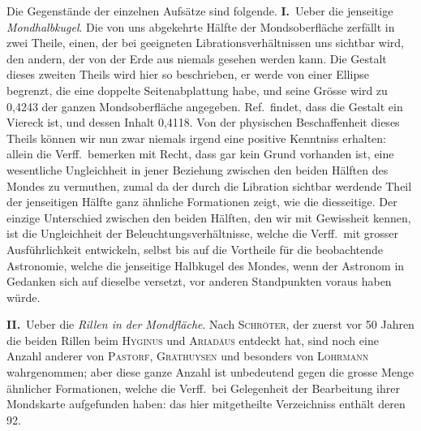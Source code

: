 \documentclass[12pt,a4paper]{article}
\begin{document}
Die Gegenst\"ande der einzelnen Aufs\"atze sind folgende. \textbf{I.}\ Ueber die jenseitige \textit{Mondhalbkugel}. Die von uns abgekehrte H\"alfte der Mondsoberfl\"ache zerf\"allt in zwei Theile, einen, der bei geeigneten Librationsverh\"altnissen uns sichtbar wird, den andern, der von der Erde aus niemals gesehen werden kann. Die Gestalt dieses zweiten Theils wird hier so beschrieben, er werde von einer Ellipse begrenzt, die eine doppelte Seitenabplattung habe, und seine Gr\"osse wird zu 0,4243 der ganzen Mondsoberfl\"ache angegeben. Ref.\ findet, dass die Gestalt ein Viereck ist, und dessen Inhalt 0,4118. Von der physischen Beschaffenheit dieses Theils k\"onnen wir nun zwar niemals irgend eine positive Kenntniss erhalten: allein die Verff.\ bemerken mit Recht, dass gar kein Grund vorhanden ist, eine wesentliche Ungleichheit in jener Beziehung zwischen den beiden H\"alften des Mondes zu vermuthen, zumal da der durch die Libration sichtbar werdende Theil der jenseitigen H\"alfte ganz \"ahnliche Formationen zeigt, wie die diesseitige. Der einzige Unterschied zwischen den beiden H\"alften, den wir mit Gewissheit kennen, ist die Ungleichheit der Beleuchtungsverh\"altnisse, welche die Verff.\ mit grosser Ausf\"uhrlichkeit entwickeln, selbst bis auf die Vortheile f\"ur die beobachtende Astronomie, welche die jenseitige Halbkugel des Mondes, wenn der Astronom in Gedanken sich auf dieselbe versetzt, vor anderen Standpunkten voraus haben w\"urde.

\textbf{II.}\ Ueber die \textit{Rillen in der Mondfl\"ache}. Nach \textsc{Schr\"oter}, der zuerst vor 50 Jahren die beiden Rillen beim \textsc{Hyginus} und \textsc{Ariad\"aus} entdeckt hat, sind noch eine Anzahl anderer von \textsc{Pastorf}, \textsc{Gr\"athuysen} und besonders von \textsc{Lohrmann} wahrgenommen; aber diese ganze Anzahl ist unbedeutend gegen die grosse Menge \"ahnlicher Formationen, welche die Verff.\ bei Gelegenheit der Bearbeitung ihrer Mondskarte aufgefunden haben: das hier mitgetheilte Verzeichniss enth\"alt deren 92.
\end{document}
